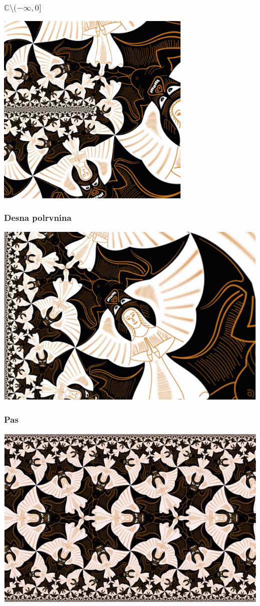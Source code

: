 \documentclass{beamer}
\newcommand{\CC}{\mathbb{C}}
\theoremstyle{definition}
\theoremstyle{plain}
\begin{document}
\begin{frame}
  \frametitle{\(\CC \setminus (- \infty, 0]\)}
  \centering
  \includegraphics[width=0.7\textwidth]{b.png} %
\end{frame}

\begin{frame}
  \frametitle{Desna polrvnina}
  \centering
  \includegraphics[width=\textwidth]{c.png} %
\end{frame}

\begin{frame}
  \frametitle{Pas}
  \centering
  \includegraphics[width=\textwidth]{d.png} %
\end{frame}
\end{document}
